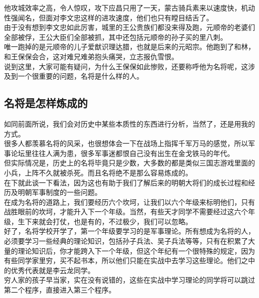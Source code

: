 \begin{multicols}{\theparacolNo}
他攻城效率之高，令人惊叹，攻下应昌只用了一天，蒙古骑兵素来以速度快，机动性强闻名，但面对李文忠这样的进攻速度，他们也只有瞠目结舌了。\\

由于没有想到李文忠如此厉害，城里的王公贵族们都没来得及跑，元顺帝的老婆们全部被俘，王公大臣们全部被抓，其中还包括元顺帝的孙子买的里八刺。\\

唯一跑掉的是元顺帝的儿子爱猷识理达腊，也就是后来的元昭宗。他跑到了和林，和王保保会合，这对难兄难弟抱头痛哭，立志报仇雪恨。\\

说到这里，大家可能有疑问，为什么王保保如此惨败，还要称呼他为名将呢，这涉及到一个很重要的问题，名将是什么样的人。\\

\subsection{名将是怎样炼成的}
如同前面所说，我们会对历史中某些本质性的东西进行分析，当然了，还是用我的方式。\\

很多人都羡慕名将的风采，也很想体会一下在战场上指挥千军万马的感觉，所以军事论坛里往往人满为患，很多军事迷都恨自己没有出生在金戈铁马的年代。\\

但实际情况是，历史上的名将毕竟只是少数，大多数的都是类似三国志游戏里面的小兵，上阵不久就被杀死。而且名将绝不是那么容易炼成的。\\

在下就此谈一下看法，因为这也有助于我们了解后来的明朝大将们的成长过程和经历及明朝军事制度的一些问题。\\

在成为名将的道路上，我们要经历六个坎坷，让我们以六个年级来标明他们，只有战胜眼前的坎坷，才能升入下一个年级。当然，有些天才同学不需要经过这六个年级，生下来就会打仗，也是有的，不过极少，我们可以忽略。\\

好了，名将学校开学了，第一个年级要学习的是军事理论。所有想成为名将的人，必须要学习一些经典的理论知识，包括孙子兵法、吴子兵法等等，只有在积累了大量的理论知识后，你才能跨入下一个年级，但这个年纪有一个很特殊的规定，因为有些同学家里穷，买不起书本，所以他们只能在实战中去学习这些理论。他们之中的优秀代表就是李云龙同学。\\

穷人家的孩子早当家，实在没有说错的，这些在实战中学习理论的同学将可以跳过第二个程序，直接进入第三个程序。\\


\end{multicols}
